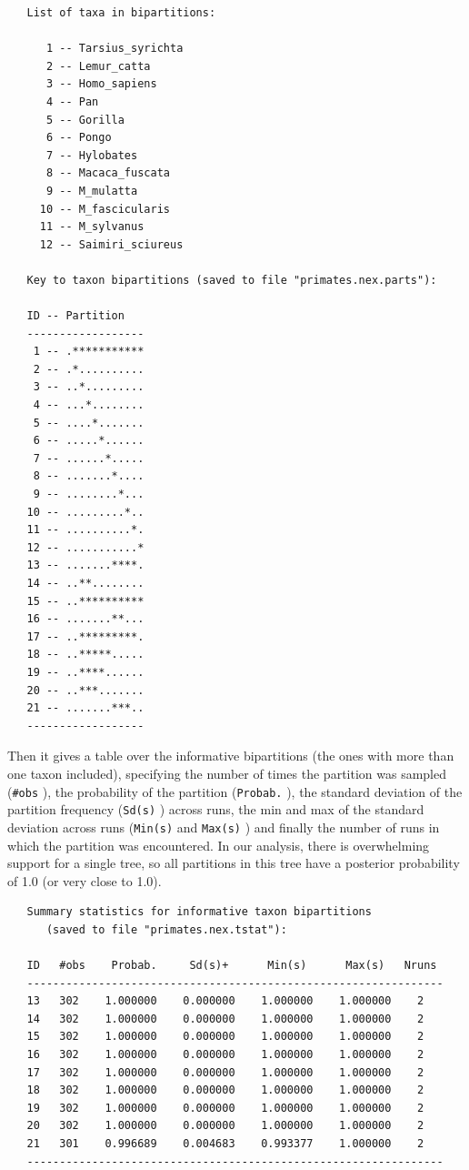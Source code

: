 \documentclass[12pt]{book}
\newcommand{\ttt}[1]{\texttt{#1} }
\begin{document}
\begin{singlespacing}
\small
\begin{verbatim}
   List of taxa in bipartitions:                                                 
                                                                                   
      1 -- Tarsius_syrichta
      2 -- Lemur_catta
      3 -- Homo_sapiens
      4 -- Pan
      5 -- Gorilla
      6 -- Pongo
      7 -- Hylobates
      8 -- Macaca_fuscata
      9 -- M_mulatta
     10 -- M_fascicularis
     11 -- M_sylvanus
     12 -- Saimiri_sciureus

   Key to taxon bipartitions (saved to file "primates.nex.parts"):

   ID -- Partition
   ------------------
    1 -- .***********
    2 -- .*..........
    3 -- ..*.........
    4 -- ...*........
    5 -- ....*.......
    6 -- .....*......
    7 -- ......*.....
    8 -- .......*....
    9 -- ........*...
   10 -- .........*..
   11 -- ..........*.
   12 -- ...........*
   13 -- .......****.
   14 -- ..**........
   15 -- ..**********
   16 -- .......**...
   17 -- ..*********.
   18 -- ..*****.....
   19 -- ..****......
   20 -- ..***.......
   21 -- .......***..
   ------------------
\end{verbatim}
\normalsize
\end{singlespacing}

Then it gives a table over the informative bipartitions (the ones with more than one taxon
included), specifying the number of times the partition was sampled (\ttt{\#obs}), the
probability of the partition (\ttt{Probab.}), the standard deviation of the partition frequency
(\ttt{Sd(s)}) across runs, the min and max of the standard deviation across runs
(\ttt{Min(s)} and \ttt{Max(s)}) and finally the number of runs in which the partition was
encountered. In our analysis, there is overwhelming support for a single tree, so all partitions in
this tree have a posterior probability of 1.0 (or very close to 1.0).

\begin{singlespacing}
\small
\begin{verbatim}
   Summary statistics for informative taxon bipartitions
      (saved to file "primates.nex.tstat"):

   ID   #obs    Probab.     Sd(s)+      Min(s)      Max(s)   Nruns 
   ----------------------------------------------------------------
   13   302    1.000000    0.000000    1.000000    1.000000    2
   14   302    1.000000    0.000000    1.000000    1.000000    2
   15   302    1.000000    0.000000    1.000000    1.000000    2
   16   302    1.000000    0.000000    1.000000    1.000000    2
   17   302    1.000000    0.000000    1.000000    1.000000    2
   18   302    1.000000    0.000000    1.000000    1.000000    2
   19   302    1.000000    0.000000    1.000000    1.000000    2
   20   302    1.000000    0.000000    1.000000    1.000000    2
   21   301    0.996689    0.004683    0.993377    1.000000    2
   ----------------------------------------------------------------
\end{verbatim}
\normalsize
\end{singlespacing}
\end{document}
